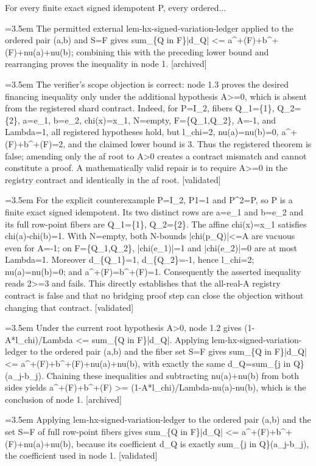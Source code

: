 \documentclass{article}
\newcommand{\step}[1]{\par\noindent\hangindent=3.5em\hangafter=1%
  \makebox[3.5em][l]{\textbf{#1.}}}
\newcommand{\steptag}[1]{\hfill{\small\textsf{[#1]}}}
\begin{document}
\begin{proofbox}{For every finite exact signed idempotent P, every ordered...}
\step{1.3} The permitted external lem-hx-signed-variation-ledger applied to the ordered pair (a,b) and S=F gives sum\_\{Q in F\}|d\_Q| <= a\textasciicircum{}+(F)+b\textasciicircum{}+(F)+nu(a)+nu(b); combining this with the preceding lower bound and rearranging proves the inequality in node 1. \steptag{archived} \\[6pt]
\step{1.3.1} The verifier's scope objection is correct: node 1.3 proves the desired financing inequality only under the additional hypothesis A>=0, which is absent from the registered shard contract. Indeed, for P=I\_2, fibers Q\_1=\{1\}, Q\_2=\{2\}, a=e\_1, b=e\_2, chi(x)=x\_1, N=empty, F=\{Q\_1,Q\_2\}, A=-1, and Lambda=1, all registered hypotheses hold, but l\_chi=2, nu(a)=nu(b)=0, a\textasciicircum{}+(F)+b\textasciicircum{}+(F)=2, and the claimed lower bound is 3. Thus the registered theorem is false; amending only the af root to A>0 creates a contract mismatch and cannot constitute a proof. A mathematically valid repair is to require A>=0 in the registry contract and identically in the af root. \steptag{validated} \\[6pt]
\step{1.3.1.1} For the explicit counterexample P=I\_2, P1=1 and P\textasciicircum{}2=P, so P is a finite exact signed idempotent. Its two distinct rows are a=e\_1 and b=e\_2 and its full row-point fibers are Q\_1=\{1\}, Q\_2=\{2\}. The affine chi(x)=x\_1 satisfies chi(a)-chi(b)=1. With N=empty, both N-bounds |chi(p\_Q)|<=A are vacuous even for A=-1; on F=\{Q\_1,Q\_2\}, |chi(e\_1)|=1 and |chi(e\_2)|=0 are at most Lambda=1. Moreover d\_\{Q\_1\}=1, d\_\{Q\_2\}=-1, hence l\_chi=2; nu(a)=nu(b)=0; and a\textasciicircum{}+(F)=b\textasciicircum{}+(F)=1. Consequently the asserted inequality reads 2>=3 and fails. This directly establishes that the all-real-A registry contract is false and that no bridging proof step can close the objection without changing that contract. \steptag{validated} \\[4pt]
\step{1.3.2} Under the current root hypothesis A>0, node 1.2 gives (1-A*l\_chi)/Lambda <= sum\_\{Q in F\}|d\_Q|. Applying lem-hx-signed-variation-ledger to the ordered pair (a,b) and the fiber set S=F gives sum\_\{Q in F\}|d\_Q| <= a\textasciicircum{}+(F)+b\textasciicircum{}+(F)+nu(a)+nu(b), with exactly the same d\_Q=sum\_\{j in Q\}(a\_j-b\_j). Chaining these inequalities and subtracting nu(a)+nu(b) from both sides yields a\textasciicircum{}+(F)+b\textasciicircum{}+(F) >= (1-A*l\_chi)/Lambda-nu(a)-nu(b), which is the conclusion of node 1. \steptag{archived} \\[4pt]
\step{1.4} Applying lem-hx-signed-variation-ledger to the ordered pair (a,b) and the set S=F of full row-point fibers gives sum\_\{Q in F\}|d\_Q| <= a\textasciicircum{}+(F)+b\textasciicircum{}+(F)+nu(a)+nu(b), because its coefficient d\_Q is exactly sum\_\{j in Q\}(a\_j-b\_j), the coefficient used in node 1. \steptag{validated} \\[4pt]

\end{proofbox}
\end{document}
